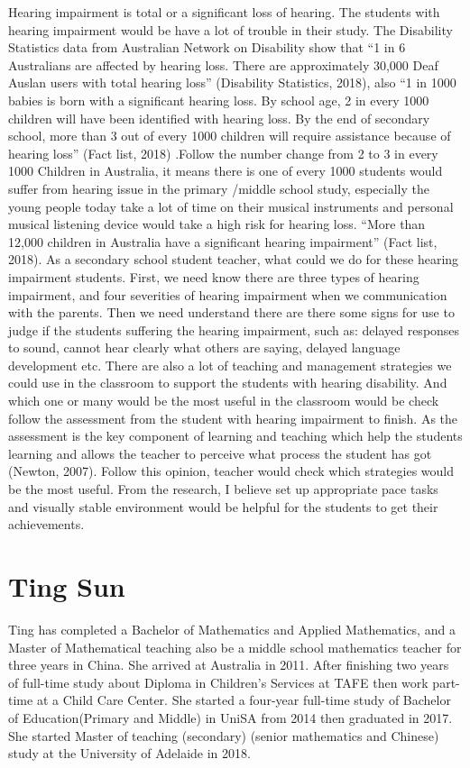 \documentclass[twoside,12pt,a4paper,notitlepage]{memoir}
\begin{document}
Hearing impairment is total or a significant loss of hearing. The students with hearing impairment would be have a lot of trouble in their study.
The Disability Statistics data from Australian Network on Disability show that “1 in 6 Australians are affected by hearing loss. There are approximately 30,000 Deaf Auslan users with total hearing loss” (Disability Statistics, 2018), also “1 in 1000 babies is born with a significant hearing loss. By school age, 2 in every 1000 children will have been identified with hearing loss. By the end of secondary school, more than 3 out of every 1000 children will require assistance because of hearing loss” (Fact list, 2018) .Follow the number change from 2 to 3 in every 1000 Children in Australia, it means there is one of every 1000 students would suffer from hearing issue in the primary /middle school study, especially the young people today take a lot of time on their musical instruments and personal musical listening device would take a high risk for hearing loss. “More than 12,000 children in Australia have a significant hearing impairment” (Fact list, 2018).
As a secondary school student teacher, what could we do for these hearing impairment students. First, we need know there are three types of hearing impairment, and four severities of hearing impairment when we communication with the parents. Then we need understand there are there some signs for use to judge if the students suffering the hearing impairment, such as: delayed responses to sound, cannot hear clearly what others are saying, delayed language development etc. There are also a lot of teaching and management strategies we could use in the classroom to support the students with hearing disability. And which one or many would be the most useful in the classroom would be check follow the assessment from the student with hearing impairment to finish. As the assessment is the key component of learning and teaching which help the students learning and allows the teacher to perceive what process the student has got (Newton, 2007). Follow this opinion, teacher would check which strategies would be the most useful. From the research, I believe set up appropriate pace tasks and visually stable environment would be helpful for the students to get their achievements.

\section*{Ting Sun}

Ting has completed a Bachelor of Mathematics and Applied Mathematics, and a Master of Mathematical teaching also be a middle school mathematics teacher for three years in China. She arrived at Australia in 2011. After finishing two years of full-time study about Diploma in Children’s Services at TAFE then work part-time at a Child Care Center. She started a four-year full-time study of Bachelor of Education(Primary and Middle) in UniSA from 2014 then graduated in 2017. She started Master of teaching (secondary) (senior mathematics and Chinese) study at the University of Adelaide in 2018.
\end{document}
